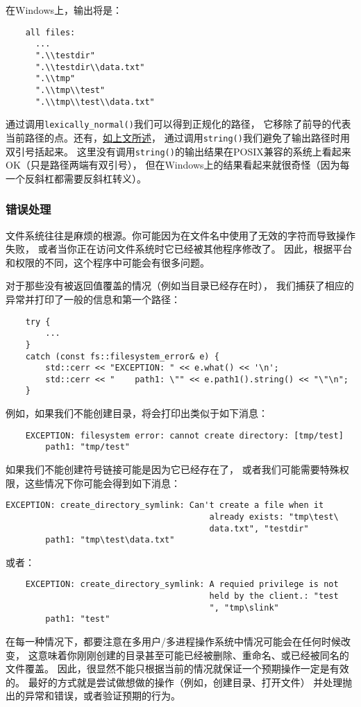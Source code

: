 在Windows上，输出将是：
\begin{lstlisting}
    all files:
      ...
      ".\\testdir"
      ".\\testdir\\data.txt"
      ".\\tmp"
      ".\\tmp\\test"
      ".\\tmp\\test\\data.txt"
\end{lstlisting}
通过调用\texttt{lexically\_normal()}我们可以得到正规化的路径，
它移除了前导的代表当前路径的点。还有，\hyperref[ch20.1.1.1]{如上文所述}，
通过调用\texttt{string()}我们避免了输出路径时用双引号括起来。
这里没有调用\texttt{string()}的输出结果在POSIX兼容的系统上看起来OK（只是路径两端有双引号），
但在Windows上的结果看起来就很奇怪（因为每一个反斜杠都需要反斜杠转义）。

\subsubsection*{错误处理}\label{ch20.1.3.6}
文件系统往往是麻烦的根源。你可能因为在文件名中使用了无效的字符而导致操作失败，
或者当你正在访问文件系统时它已经被其他程序修改了。
因此，根据平台和权限的不同，这个程序中可能会有很多问题。

对于那些没有被返回值覆盖的情况（例如当目录已经存在时），
我们捕获了相应的异常并打印了一般的信息和第一个路径：
\begin{lstlisting}
    try {
        ...
    }
    catch (const fs::filesystem_error& e) {
        std::cerr << "EXCEPTION: " << e.what() << '\n';
        std::cerr << "    path1: \"" << e.path1().string() << "\"\n";
    }
\end{lstlisting}
例如，如果我们不能创建目录，将会打印出类似于如下消息：
\begin{lstlisting}
    EXCEPTION: filesystem error: cannot create directory: [tmp/test]
        path1: "tmp/test"
\end{lstlisting}
如果我们不能创建符号链接可能是因为它已经存在了，
或者我们可能需要特殊权限，这些情况下你可能会得到如下消息：\label{创建链接失败}
\begin{lstlisting}[]
    EXCEPTION: create_directory_symlink: Can't create a file when it
                                         already exists: "tmp\test\
                                         data.txt", "testdir"
        path1: "tmp\test\data.txt"
\end{lstlisting}
或者：
\begin{lstlisting}
    EXCEPTION: create_directory_symlink: A requied privilege is not
                                         held by the client.: "test
                                         ", "tmp\slink"
        path1: "test"
\end{lstlisting}
在每一种情况下，都要注意在多用户/多进程操作系统中情况可能会在任何时候改变，
这意味着你刚刚创建的目录甚至可能已经被删除、重命名、或已经被同名的文件覆盖。
因此，很显然不能只根据当前的情况就保证一个预期操作一定是有效的。
最好的方式就是尝试做想做的操作（例如，创建目录、打开文件）
并处理抛出的异常和错误，或者验证预期的行为。

